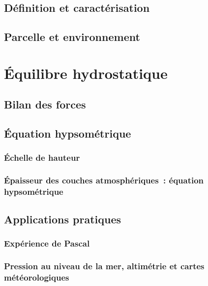 \documentclass[a4paper,DIV16,10pt]{scrartcl}
\begin{document}
	\sk \subsection{Définition et caractérisation}
	
	

	\sk \subsection{Parcelle et environnement} \label{parcenv}
	

\mk \section{Équilibre hydrostatique}

	\sk \subsection{Bilan des forces}
	

	\sk \subsection{\'Equation hypsométrique}

		\sk \subsubsection{\'Echelle de hauteur}
		

		\sk \subsubsection{\'Epaisseur des couches atmosphériques~: équation hypsométrique}
		

	\sk \subsection{Applications pratiques}

		\sk \subsubsection{Expérience de Pascal}
		

		\sk \subsubsection{Pression au niveau de la mer, altimétrie et cartes météorologiques}
		
\end{document}
